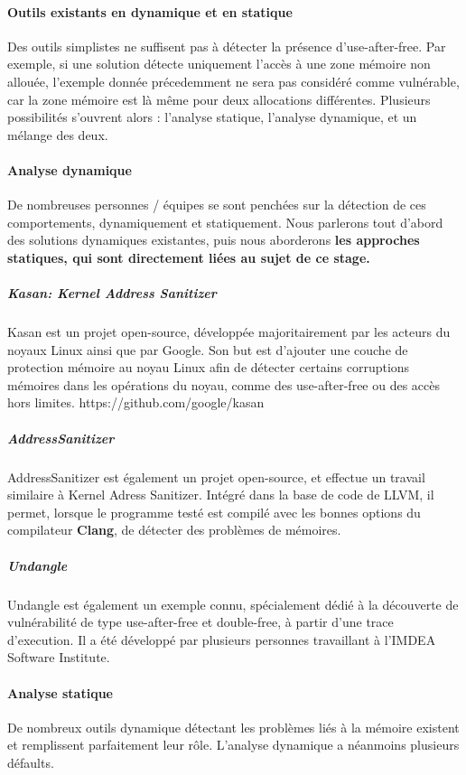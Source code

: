 \paragraph{Outils existants en dynamique et en statique}
Des outils simplistes ne suffisent pas à détecter la présence d'use-after-free.\newline
Par exemple, si une solution détecte uniquement l'accès à une zone mémoire non allouée, l'exemple
donnée précedemment ne sera pas considéré comme vulnérable, car la zone mémoire est là même pour deux
allocations différentes. Plusieurs possibilités s'ouvrent alors : l'analyse statique, l'analyse dynamique,
et un mélange des deux.

\paragraph{Analyse dynamique}
De nombreuses personnes / équipes se sont penchées sur la détection de ces comportements, dynamiquement et
statiquement. Nous parlerons tout d'abord des solutions dynamiques existantes, puis nous aborderons \textbf{les approches
statiques, qui sont directement liées au sujet de ce stage.}

\subparagraph{Kasan: Kernel Address Sanitizer}
Kasan est un projet open-source, développée majoritairement
par les acteurs du noyaux Linux ainsi que par Google. Son but est d'ajouter une couche de protection
mémoire au noyau Linux afin de détecter certains corruptions mémoires dans les opérations du noyau, comme
des use-after-free ou des accès hors limites.
https://github.com/google/kasan

\subparagraph{AddressSanitizer}
AddressSanitizer est également un projet open-source, et effectue
un travail similaire à Kernel Adress Sanitizer. Intégré dans la base de code de
LLVM, il permet, lorsque le programme testé est compilé avec les bonnes options du compilateur \textbf{Clang},
de détecter des problèmes de mémoires.

\subparagraph{Undangle}
Undangle est également un exemple connu, spécialement dédié à la découverte de vulnérabilité
de type use-after-free et double-free, à partir d'une trace d'execution. Il a été développé par plusieurs
personnes travaillant à l'IMDEA Software Institute.

\paragraph{Analyse statique}

De nombreux outils dynamique détectant les problèmes liés à la mémoire existent et remplissent parfaitement leur rôle.
L'analyse dynamique a néanmoins plusieurs défaults.\newline

